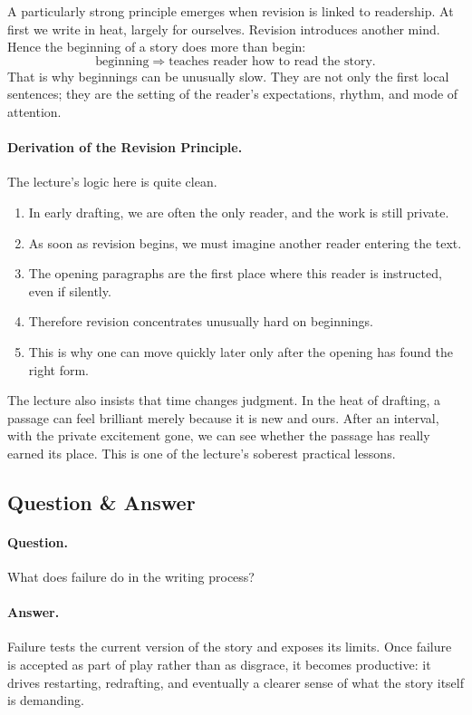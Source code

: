 A particularly strong principle emerges when revision is linked to readership. At first we write in heat, largely for ourselves. Revision introduces another mind. Hence the beginning of a story does more than begin:
\begin{equation}
\text{beginning} \Rightarrow \text{teaches reader how to read the story}.
\end{equation}
That is why beginnings can be unusually slow. They are not only the first local sentences; they are the setting of the reader's expectations, rhythm, and mode of attention.

\paragraph{Derivation of the Revision Principle.} The lecture's logic here is quite clean.
\begin{enumerate}
\item In early drafting, we are often the only reader, and the work is still private.
\item As soon as revision begins, we must imagine another reader entering the text.
\item The opening paragraphs are the first place where this reader is instructed, even if silently.
\item Therefore revision concentrates unusually hard on beginnings.
\item This is why one can move quickly later only after the opening has found the right form.
\end{enumerate}

The lecture also insists that time changes judgment. In the heat of drafting, a passage can feel brilliant merely because it is new and ours. After an interval, with the private excitement gone, we can see whether the passage has really earned its place. This is one of the lecture's soberest practical lessons.

\subsection{Question \& Answer}

\paragraph{Question.} What does failure do in the writing process?

\paragraph{Answer.} Failure tests the current version of the story and exposes its limits. Once failure is accepted as part of play rather than as disgrace, it becomes productive: it drives restarting, redrafting, and eventually a clearer sense of what the story itself is demanding.

